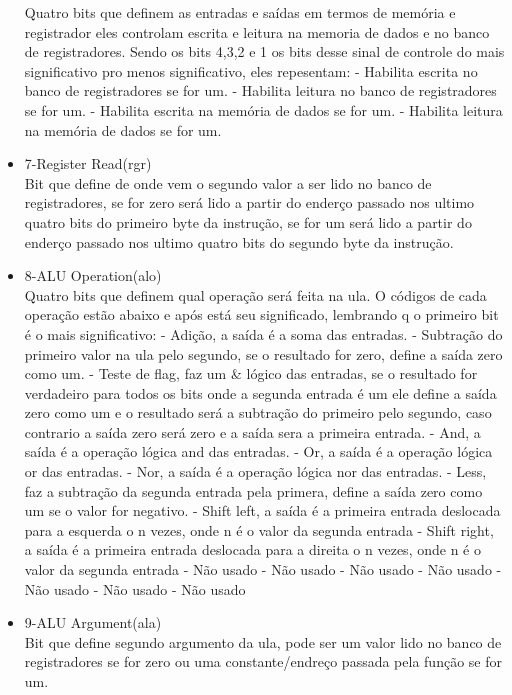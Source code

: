 \documentclass[a4paper, 10pt]{article}
\begin{document}
\begin{itemize}
	Quatro bits que definem as entradas e saídas em termos de memória e registrador eles controlam escrita e leitura na memoria de dados e no banco de registradores. Sendo os bits 4,3,2 e 1 os bits desse sinal de controle do mais significativo pro menos significativo, eles repesentam:
	 - Habilita escrita no banco de registradores se for um.
	 - Habilita leitura no banco de registradores se for um.
	 - Habilita escrita na memória de dados se for um.
	 - Habilita leitura na memória de dados se for um.
	\item 7-Register Read(rgr)\\
	Bit que define de onde vem o segundo valor a ser lido no banco de registradores, se for zero será lido a partir do enderço passado nos ultimo quatro bits do primeiro byte da instrução, se for um será lido a partir do enderço passado nos ultimo quatro bits do segundo byte da instrução.
	\item 8-ALU Operation(alo)\\
	Quatro bits que definem qual operação será feita na ula. O códigos de cada operação estão abaixo e após está seu significado, lembrando q o primeiro bit é o mais significativo:
	 - Adição, a saída é a soma das entradas.
	 - Subtração do primeiro valor na ula pelo segundo, se o resultado for zero, define a saída zero como um.
	 - Teste de flag, faz um \& lógico das entradas, se o resultado for verdadeiro para todos os bits onde a segunda entrada é um ele define a saída zero como um e o resultado será a subtração do primeiro pelo segundo, caso contrario a saída zero será zero e a saída sera a primeira entrada.
	 - And, a saída é a operação lógica and das entradas.
	 - Or, a saída é a operação lógica or das entradas.
	 - Nor, a saída é a operação lógica nor das entradas.
	 - Less, faz a subtração da segunda entrada pela primera, define a saída zero como um se o valor for negativo.
	 - Shift left, a saída é a primeira entrada deslocada para a esquerda o n vezes, onde n é o valor da segunda entrada
	 - Shift right, a saída é a primeira entrada deslocada para a direita o n vezes, onde n é o valor da segunda entrada
	 - Não usado
	 - Não usado
	 - Não usado
	 - Não usado
	 - Não usado
	 - Não usado
	 - Não usado
	\item 9-ALU Argument(ala)\\
	Bit que define segundo argumento da ula, pode ser um valor lido no banco de registradores se for zero ou uma constante/endreço passada pela função se for um.
\end{itemize}
\end{document}

